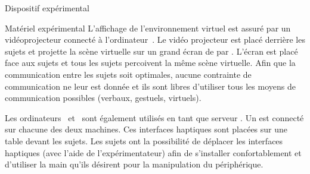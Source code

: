 \documentclass[myfrancais]{mythesis}
\begin{document}
\begin{mychapter}{Dispositif expérimental}
\begin{mysection}{Matériel expérimental}
			L'affichage de l'environnement virtuel est assuré par un vidéoprojecteur connecté à l'ordinateur~.
			Le vidéo projecteur est placé derrière les sujets et projette la scène virtuelle sur un grand écran de  par .
			L'écran est placé face aux sujets et tous les sujets percoivent la même scène virtuelle.
			Afin que la communication entre les sujets soit optimales, aucune contrainte de communication ne leur est donnée et ils sont libres d'utiliser tous les moyens de communication possibles (verbaux, gestuels, virtuels\myetc).

			Les ordinateurs~ et~ sont également utilisés en tant que serveur .
			Un \myOmni est connecté sur chacune des deux machines.
			Ces interfaces haptiques sont placées sur une table devant les sujets.
			Les sujets ont la possibilité de déplacer les interfaces haptiques (avec l'aide de l'expérimentateur) afin de s'installer confortablement et d'utiliser la main qu'ils désirent pour la manipulation du périphérique.


\end{mysection}
\end{mychapter}
\end{document}
